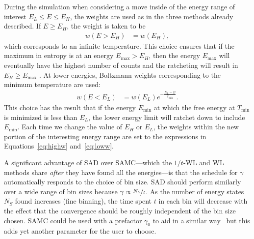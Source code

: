 \documentclass[letterpaper,twocolumn,amsmath,amssymb,pre,aps,10pt]{revtex4-1}
\begin{document}
During the simulation when considering a move inside of the energy
range of interest $E_L \le E \le E_H$, the weights are used as in the
three methods already described.  If $E\ge E_H$, the weight is taken
to be
\begin{align}\label{eq:highw}
  w(E>E_H) &= w(E_H),
\end{align}
which corresponds to an infinite temperature.  This choice ensures
that if the maximum in entropy is at an energy $E_{\max}>E_H$, then
the energy $E_{\max}$ will eventually have the highest number of
counts and the ratcheting will result in $E_H\ge E_{\max}$ .  At lower
energies, Boltzmann weights corresponding to the minimum temperature
are used:
\begin{align}\label{eq:loww}
  w(E<E_L) &= w(E_L)e^{-\frac{E_L-E}{T_{\min}}}.
\end{align}
This choice has the result that if the energy $E_{\min}$ at which the free
energy at $T_{\min}$ is minimized is less than $E_L$, the lower energy
limit will ratchet down to include $E_{\min}$.
Each time we change the value of $E_H$ or $E_L$, the weights within the
new portion of the interesting energy range are set to the expressions
in Equations~\ref{eq:highw} and~\ref{eq:loww}.


A significant advantage of SAD over SAMC---which the $1/t$-WL and WL
methods share \emph{after} they have found all the energies---is that
the schedule for $\gamma$ automatically responds to the choice of bin
size. SAD should perform similarly over a wide range of bin sizes
because $\gamma \propto \nicefrac{N_S}{t}$.  As the number of energy
states $N_S$ found increases (fine binning), the time spent $t$ in
each bin will decrease with the effect that the convergence should be
roughly independent of the bin size chosen.  SAMC could be used with a
prefactor $\gamma_0$ to aid in a similar
way~\cite{werlich2015stochastic} but this adds yet another parameter
for the user to choose.
\end{document}
